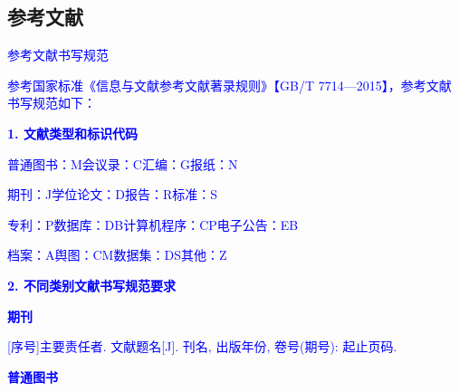 %
%
%
%
%
%
%

\begin{bibprint}

  \chapter{参考文献}

\textcolor{blue}{参考文献书写规范}

\textcolor{blue}{参考国家标准《信息与文献参考文献著录规则》【GB/T 7714—2015】，参考文献书写规范如下：}

\textcolor{blue}{\textbf{1. 文献类型和标识代码}}

\textcolor{blue}{普通图书：M}\qquad\textcolor{blue}{会议录：C}\qquad\textcolor{blue}{汇编：G}\qquad\textcolor{blue}{报纸：N}

\textcolor{blue}{期刊：J}\qquad\textcolor{blue}{学位论文：D}\qquad\textcolor{blue}{报告：R}\qquad\textcolor{blue}{标准：S}

\textcolor{blue}{专利：P}\qquad\textcolor{blue}{数据库：DB}\qquad\textcolor{blue}{计算机程序：CP}\qquad\textcolor{blue}{电子公告：EB}

\textcolor{blue}{档案：A}\qquad\textcolor{blue}{舆图：CM}\qquad\textcolor{blue}{数据集：DS}\qquad\textcolor{blue}{其他：Z}

\textcolor{blue}{\textbf{2. 不同类别文献书写规范要求}}

\textcolor{blue}{\textbf{期刊}}

\noindent\textcolor{blue}{[序号]主要责任者. 文献题名[J]. 刊名, 出版年份, 卷号(期号): 起止页码. }

\printbibliography [type=article,heading=none] 

\textcolor{blue}{\textbf{普通图书}}


\end{bibprint}
